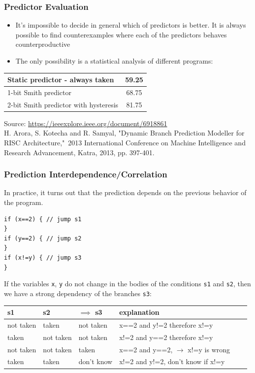 \documentclass[aspectratio=169]{beamer}
\begin{document}
\begin{frame}
\frametitle{Predictor Evaluation}

\begin{itemize}
\item It's impossible to decide in general which of predictors is better. It is always possible to find counterexamples where each of the predictors behaves counterproductive
\item The only possibility is a statistical analysis of different programs:
\end{itemize}
\begin{center}
\begin{tabular}{|l|c|} \hline
Static predictor - always taken & 59.25 \\\hline
1-bit Smith predictor & 68.75 \\\hline
2-bit Smith predictor with hysteresis & 81.75 \\\hline
\end{tabular}
\end{center}

Source: \url{https://ieeexplore.ieee.org/document/6918861}\\
H. Arora, S. Kotecha and R. Samyal, "Dynamic Branch Prediction Modeller for RISC Architecture," 2013 International Conference on Machine Intelligence and Research Advancement, Katra, 2013, pp. 397-401.
\end{frame}

\begin{frame}[fragile]
\frametitle{Prediction Interdependence/Correlation}

In practice, it turns out that the prediction depends on the previous behavior of the program.

\begin{verbatim}
if (x==2) { // jump s1
}
if (y==2) { // jump s2
}
if (x!=y) { // jump s3
}
\end{verbatim}

If the variables \texttt{x}, \texttt{y} do not change in the bodies of the conditions \texttt{s1} and \texttt{s2}, then we have a strong dependency of the branches \texttt{s3}:

\bigskip

\begin{tabular}{|l|l|l|l|l|l|}\hline
s1 & s2 & $\implies$ s3 & explanation \\\hline
not taken & taken & not taken & x==2 and y!=2 therefore x!=y \\\hline
taken & not taken & not taken & x!=2 and y==2 therefore x!=y \\\hline
not taken & not taken & taken & x==2 and y==2, $\rightarrow$ x!=y is wrong\\\hline
taken & taken & don't know & x!=2 and y!=2, don't know if x!=y \\\hline
\end{tabular}
\end{frame}
\end{document}
